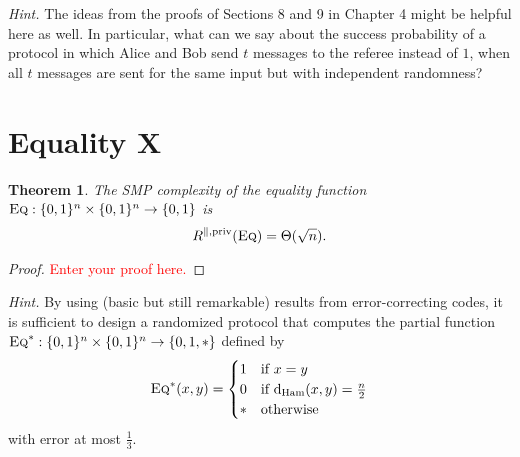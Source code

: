 \documentclass[11pt]{amsart}
\theoremstyle{plain}
\newtheorem{theorem}{Theorem}
\theoremstyle{definition}
\theoremstyle{plain}
\newcommand{\dHam}{\mathrm{d}_{\mathrm{Ham}}}
\newcommand{\Eq}{\textsc{Eq}}
\newcommand{\replacethistext}[1]{\textcolor{red}{#1}}
\begin{document}
\bigskip
\noindent \emph{Hint.} The ideas from the proofs of Sections 8 and 9 in Chapter 4 might be helpful here as well. In particular, what can we say about the success probability of a protocol in which Alice and Bob send $t$ messages to the referee instead of $1$, when all $t$ messages are sent for the same input but with independent randomness?


\newpage 
\section{Equality X}

\begin{theorem}
The SMP complexity of the equality function $\Eq : \{0,1\}^n \times \{0,1\}^n \to \{0,1\}$ is
\[
R^{\parallel,\mathrm{priv}}(\Eq) = \Theta(\sqrt{n}).
\]
\end{theorem}

\begin{proof}
\replacethistext{Enter your proof here.}
\end{proof}

\bigskip
\noindent \emph{Hint.} By using (basic but still remarkable) results from error-correcting codes, it is sufficient to design a randomized protocol that computes the partial function $\Eq^* : \{0,1\}^n \times \{0,1\}^n \to \{0,1,*\}$ defined by
\[
\Eq^*(x,y) = \begin{cases}
1 & \mbox{if } x = y \\
0 & \mbox{if } \dHam(x,y) = \frac n2 \\
* & \mbox{otherwise}
\end{cases}
\]
with error at most $\frac13$.
\end{document}
